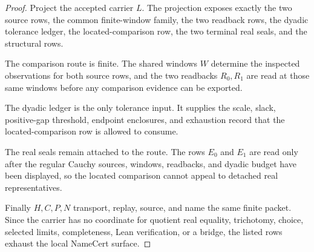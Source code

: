 \begin{proof}
Project the accepted carrier $L$. The projection exposes exactly the two source rows, the common finite-window family, the two readback rows, the dyadic tolerance ledger, the located-comparison row, the two terminal real seals, and the structural rows.

The comparison route is finite. The shared windows $W$ determine the inspected observations for both source rows, and the two readbacks $R_0,R_1$ are read at those same windows before any comparison evidence can be exported.

The dyadic ledger is the only tolerance input. It supplies the scale, slack, positive-gap threshold, endpoint enclosures, and exhaustion record that the located-comparison row is allowed to consume.

The real seals remain attached to the route. The rows $E_0$ and $E_1$ are read only after the regular Cauchy sources, windows, readbacks, and dyadic budget have been displayed, so the located comparison cannot appeal to detached real representatives.

Finally $H,C,P,N$ transport, replay, source, and name the same finite packet. Since the carrier has no coordinate for quotient real equality, trichotomy, choice, selected limits, completeness, Lean verification, or a bridge, the listed rows exhaust the local NameCert surface.
\end{proof}

